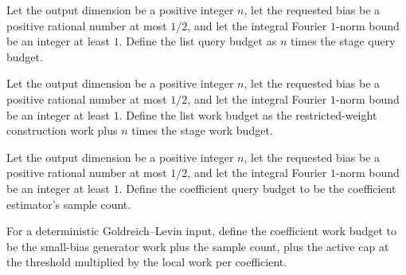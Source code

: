 \begin{definition}
\label{FABL.deterministicGoldreichLevinListQueryBudget}
\leanok
{}
Let the output dimension be a positive integer $n$, let the requested bias be a positive
rational number at most $1/2$, and let the integral Fourier $1$-norm bound be an integer
at least $1$. Define the list query budget as $n$ times the stage query budget.
\end{definition}

\begin{definition}
\label{FABL.deterministicGoldreichLevinListWorkBudget}
\leanok
{}
Let the output dimension be a positive integer $n$, let the requested bias be a positive
rational number at most $1/2$, and let the integral Fourier $1$-norm bound be an integer
at least $1$. Define the list work budget as the restricted-weight construction work
plus $n$ times the stage work budget.
\end{definition}

\begin{definition}
\label{FABL.deterministicGoldreichLevinCoefficientQueryBudget}
\leanok
{}
Let the output dimension be a positive integer $n$, let the requested bias be a positive
rational number at most $1/2$, and let the integral Fourier $1$-norm bound be an integer
at least $1$. Define the coefficient query budget to be the coefficient estimator’s
sample count.
\end{definition}

\begin{definition}
\label{FABL.deterministicGoldreichLevinCoefficientWorkBudget}
\leanok
{}
For a deterministic Goldreich–Levin input, define the coefficient work budget to be the
small-bias generator work plus the sample count, plus the active cap at the threshold
multiplied by the local work per coefficient.
\end{definition}

